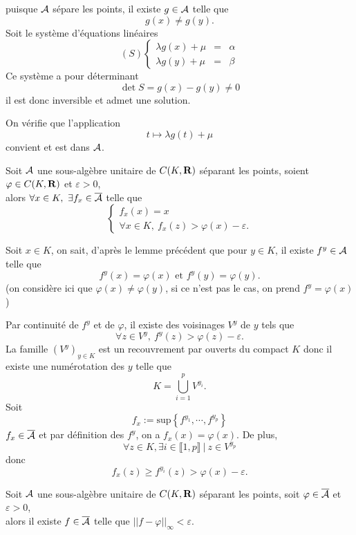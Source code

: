 \documentclass[a4paper,11pt, twoside]{article}
\begin{document}
\begin{Proof}
  puisque $\mathcal A$ sépare les points, il existe $g\in\mathcal A$ telle que
  $$g(x)\neq g(y).$$
  Soit le système d'équations linéaires
  $$(S)\left\{\begin{array}{rcl}
    \lambda g(x)+\mu&=&\alpha\\
    \lambda g(y)+\mu&=&\beta
  \end{array}\right.$$
  Ce système a pour déterminant
  $$\det S=g(x)-g(y)\neq 0$$
  il est donc inversible et admet une solution.

  On vérifie que l'application 
  $$t\longmapsto \lambda g(t)+\mu$$
  convient et est dans $\mathcal A$.
\end{Proof}


\begin{lemme}
  Soit $\mathcal A$ une sous-algèbre unitaire de $C(K,\mathbf R)$ séparant les points, soient $\varphi\in C(K,\mathbf R)$ et $\varepsilon>0$,\\

  alors $\forall x\in K,\ \exists f_x\in\overline{\mathcal A}$ telle que 
  $$\left\{\begin{array}{l}
    f_x(x)=x\\
    \forall x\in K,\ f_x(z)>\varphi(x)-\varepsilon.
  \end{array}\right.$$
\end{lemme}


\begin{Proof}
  Soit $x\in K$, on sait, d'après le lemme précédent que pour $y\in K$, il existe $f^y\in \mathcal A$ telle que 
  $$f^y(x)=\varphi(x)\text{ et }f^y(y)=\varphi(y).$$
  (on considère ici que $\varphi(x)\neq\varphi(y)$, si ce n'est pas le cas, on prend $f^y=\varphi(x)$)

  Par continuité de $f^y$ et de $\varphi$, il existe des voisinages $V^y$ de $y$ tels que 
  $$\forall z\in V^y,\ f^y(z)>\varphi(z)-\varepsilon.$$
  La famille $(V^y)_{y\in K}$ est un recouvrement par ouverts du compact $K$ donc il existe une numérotation des $y$ telle que 
  $$K=\bigcup_{i=1}^p V^{y_i}.$$
  Soit 
  $$f_x:=\mathrm{sup}\left\{f^{y_1},\cdots,f^{y_p}\right\}$$
  $f_x\in\overline{\mathcal A}$ et par définition des $f^y$, on a $f_x(x)=\varphi(x)$. De plus,
  $$\forall z\in K,\exists i\in\llbracket 1,p\rrbracket\ |\ z\in V^{y_p}$$
  donc
  $$f_x(z)\geqslant f^{y_i}(z)>\varphi(x)-\varepsilon.$$
\end{Proof}


\begin{lemme}
  Soit $\mathcal A$ une sous-algèbre unitaire de $C(K,\mathbf R)$ séparant les points, soit $\varphi\in\overline{\mathcal A}$ et $\varepsilon>0$,\\

  alors il existe $f\in\overline{\mathcal A}$ telle que $||f-\varphi||_{\infty}<\varepsilon.$
\end{lemme}
\end{document}
